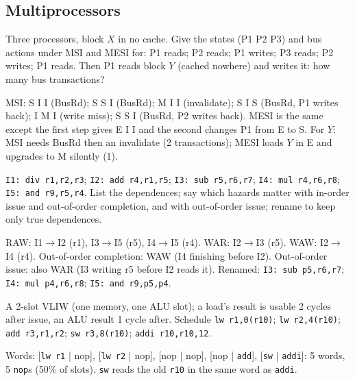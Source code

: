 \subsection{Multiprocessors}

\begin{exercise}
Three processors, block $X$ in no cache. Give the states (P1 P2 P3) and bus actions
under MSI and MESI for: P1 reads; P2 reads; P1 writes; P3 reads; P2 writes; P1 reads.
Then P1 reads block $Y$ (cached nowhere) and writes it: how many bus transactions?
\end{exercise}
\begin{solution}
MSI: S I I (BusRd); S S I (BusRd); M I I (invalidate); S I S (BusRd, P1 writes back);
I M I (write miss); S S I (BusRd, P2 writes back). MESI is the same except the first
step gives E I I and the second changes P1 from E to S. For $Y$: MSI needs BusRd then an
invalidate (2 transactions); MESI loads $Y$ in E and upgrades to M silently (1).
\end{solution}

\begin{exercise}
\texttt{I1: div r1,r2,r3}; \texttt{I2: add r4,r1,r5}; \texttt{I3: sub r5,r6,r7};
\texttt{I4: mul r4,r6,r8}; \texttt{I5: and r9,r5,r4}. List the dependences; say which
hazards matter with in-order issue and out-of-order completion, and with out-of-order
issue; rename to keep only true dependences.
\end{exercise}
\begin{solution}
RAW: I1$\to$I2 (r1), I3$\to$I5 (r5), I4$\to$I5 (r4). WAR: I2$\to$I3 (r5). WAW:
I2$\to$I4 (r4). Out-of-order completion: WAW (I4 finishing before I2). Out-of-order
issue: also WAR (I3 writing r5 before I2 reads it). Renamed: \texttt{I3: sub p5,r6,r7};
\texttt{I4: mul p4,r6,r8}; \texttt{I5: and r9,p5,p4}.
\end{solution}

\begin{exercise}[VLIW]
A 2-slot VLIW (one memory, one ALU slot); a load's result is usable 2 cycles after
issue, an ALU result 1 cycle after. Schedule \texttt{lw r1,0(r10)};
\texttt{lw r2,4(r10)}; \texttt{add r3,r1,r2}; \texttt{sw r3,8(r10)};
\texttt{addi r10,r10,12}.
\end{exercise}
\begin{solution}
Words: [\texttt{lw r1} | nop], [\texttt{lw r2} | nop], [nop | nop], [nop |
\texttt{add}], [\texttt{sw} | \texttt{addi}]: 5 words, 5 \texttt{nop}s (50\% of
slots). \texttt{sw} reads the old \texttt{r10} in the same word as \texttt{addi}.
\end{solution}

